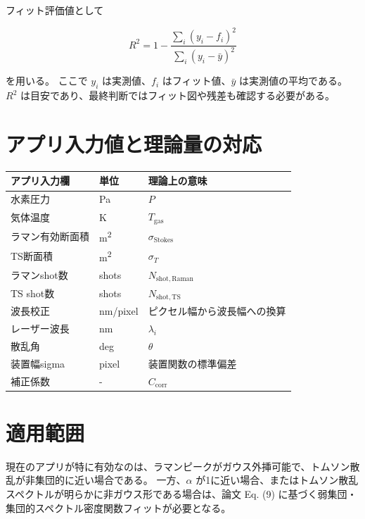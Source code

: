 \documentclass[11pt]{ltjsarticle}
\begin{document}
フィット評価値として

\begin{equation}
R^2
=
1
-
\frac{
\sum_i (y_i - f_i)^2
}{
\sum_i (y_i - \bar{y})^2
}
\end{equation}

を用いる。
ここで $y_i$ は実測値、$f_i$ はフィット値、$\bar{y}$ は実測値の平均である。
$R^2$ は目安であり、最終判断ではフィット図や残差も確認する必要がある。

\section{アプリ入力値と理論量の対応}

\begin{table}[h]
\centering
\begin{tabular}{lll}
\toprule
アプリ入力欄 & 単位 & 理論上の意味 \\
\midrule
水素圧力 & \si{Pa} & $P$ \\
気体温度 & \si{K} & $T_{\mathrm{gas}}$ \\
ラマン有効断面積 & \si{m^2} & $\sigma_{\mathrm{Stokes}}$ \\
TS断面積 & \si{m^2} & $\sigma_T$ \\
ラマンshot数 & shots & $N_{\mathrm{shot,Raman}}$ \\
TS shot数 & shots & $N_{\mathrm{shot,TS}}$ \\
波長校正 & \si{nm/pixel} & ピクセル幅から波長幅への換算 \\
レーザー波長 & \si{nm} & $\lambda_i$ \\
散乱角 & deg & $\theta$ \\
装置幅sigma & pixel & 装置関数の標準偏差 \\
補正係数 & - & $C_{\mathrm{corr}}$ \\
\bottomrule
\end{tabular}
\end{table}

\section{適用範囲}

現在のアプリが特に有効なのは、ラマンピークがガウス外挿可能で、トムソン散乱が非集団的に近い場合である。
一方、$\alpha$ が1に近い場合、またはトムソン散乱スペクトルが明らかに非ガウス形である場合は、論文 Eq. (9) に基づく弱集団・集団的スペクトル密度関数フィットが必要となる。
\end{document}
